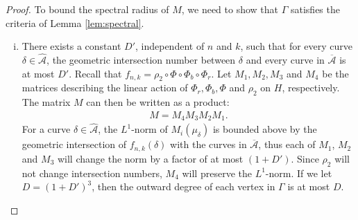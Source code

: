 \begin{proof}

To bound the spectral radius of $M$, we need to show that $\Gamma$ satisfies
the criteria of Lemma \ref{lem:spectral}.


\begin{enumerate}[(i)]
\item There exists a constant $D'$, independent of $n$ and
  $k$, such that for every curve $\delta \in \widehat{\mathcal{A}}$, the geometric
  intersection number between $\delta$ and every curve in $\overline{\mathcal{A}}$ is at most $D'$. %
  Recall that $f_{n,k}=\rho_2\circ\Phi\circ\Phi_b\circ\Phi_r$.  Let $M_1,M_2,M_3$ and $M_4$ be the matrices describing the linear action of $\Phi_r,\Phi_b,\Phi$ and $\rho_2$ on $H$, respectively. The matrix
  $M$ can then be written as a product:
  \begin{align*}
    M = M_4M_3M_2M_1.
  \end{align*}
  For a curve $\delta \in \hat{\mathcal{A}}$, the $L^1$-norm of $M_i(\mu_\delta)$ is bounded above by the geometric intersection of
  $f_{n,k}(\delta)$ with the curves in $\overline{\mathcal{A}}$, thus each of $M_1$, $M_2$ and $M_3$ will change the norm by
  a factor of at most $(1 + D')$. Since $\rho_2$ will not change intersection numbers, $M_4$ will preserve the
  $L^1$-norm. If we let $D = (1 + D')^3$, then the outward degree of each vertex in $\Gamma$ is at most $D$.
  

\end{enumerate}
\end{proof}
